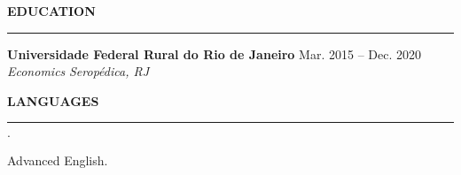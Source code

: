 \documentclass[12pt,letterpaper]{article}
\newenvironment{tightlist}
  {\begin{list}
    {$\cdot$}
    {
      \setlength{\leftmargin}{0em}
      \setlength{\itemsep}{-\smallskipamount}
    }
  }
{\end{list}}
\begin{document}
\medskip \textbf{EDUCATION} \medskip
\hrule

\textbf{Universidade Federal Rural do Rio de Janeiro} \hfill {Mar. 2015 -- Dec. 2020} \\
\emph{Economics} \hfill \emph{Seropédica, RJ} {\parfillskip=0pt\par}

\medskip \textbf{LANGUAGES} \medskip
\hrule

\begin{tightlist}
  \item Advanced English.
\end{tightlist}
\end{document}
